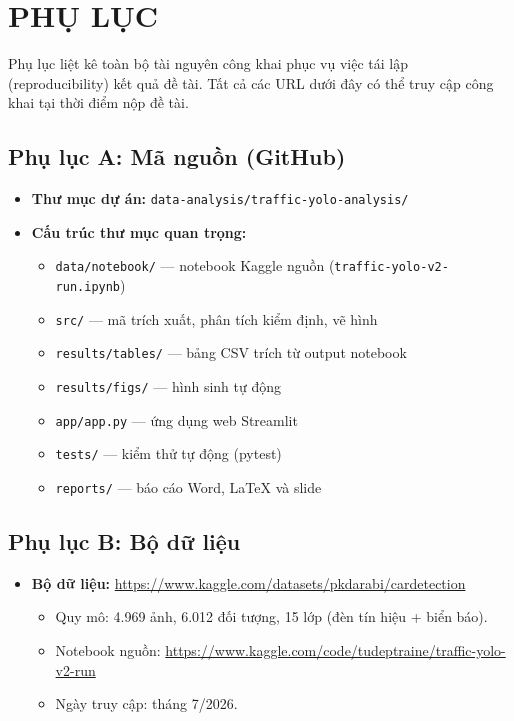 \chapter*{PHỤ LỤC}

Phụ lục liệt kê toàn bộ tài nguyên công khai phục vụ việc tái lập (reproducibility) kết quả đề
tài. Tất cả các URL dưới đây có thể truy cập công khai tại thời điểm nộp đề tài.

\section*{Phụ lục A: Mã nguồn (GitHub)}
\label{app:github}

\begin{itemize}[leftmargin=1.5cm]
\item \textbf{Thư mục dự án:} \texttt{data-analysis/traffic-yolo-analysis/}
\item \textbf{Cấu trúc thư mục quan trọng:}
\begin{itemize}
\item \texttt{data/notebook/} --- notebook Kaggle nguồn (\texttt{traffic-yolo-v2-run.ipynb})
\item \texttt{src/} --- mã trích xuất, phân tích kiểm định, vẽ hình
\item \texttt{results/tables/} --- bảng CSV trích từ output notebook
\item \texttt{results/figs/} --- hình sinh tự động
\item \texttt{app/app.py} --- ứng dụng web Streamlit
\item \texttt{tests/} --- kiểm thử tự động (pytest)
\item \texttt{reports/} --- báo cáo Word, LaTeX và slide
\end{itemize}
\end{itemize}

\section*{Phụ lục B: Bộ dữ liệu}
\label{app:dataset}

\begin{itemize}[leftmargin=1.5cm]
\item \textbf{Bộ dữ liệu:} \url{https://www.kaggle.com/datasets/pkdarabi/cardetection}
\begin{itemize}
\item Quy mô: 4.969 ảnh, 6.012 đối tượng, 15 lớp (đèn tín hiệu + biển báo).
\item Notebook nguồn: \url{https://www.kaggle.com/code/tudeptraine/traffic-yolo-v2-run}
\item Ngày truy cập: tháng 7/2026.
\end{itemize}
\end{itemize}

